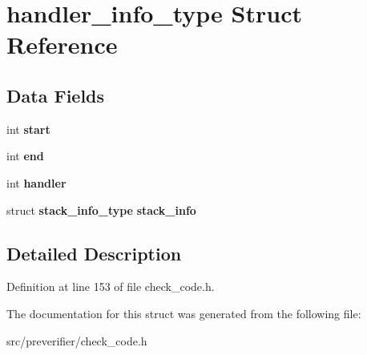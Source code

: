 \section{handler\_\-info\_\-type Struct Reference}
\label{structhandler__info__type}
\subsection*{Data Fields}
\begin{DoxyCompactItemize}
\item 
int {\bfseries start}\label{structhandler__info__type_a79ffb92f07062c2058a87ce0cb15ec42}

\item 
int {\bfseries end}\label{structhandler__info__type_aabad33be309cd4559102cd3df5931e39}

\item 
int {\bfseries handler}\label{structhandler__info__type_a7642d8eec414d6e15ab55367262d2345}

\item 
struct {\bf stack\_\-info\_\-type} {\bfseries stack\_\-info}\label{structhandler__info__type_a5229ad9923fa4659c892f2f2ece00dc4}

\end{DoxyCompactItemize}


\subsection{Detailed Description}


Definition at line 153 of file check\_\-code.h.



The documentation for this struct was generated from the following file:\begin{DoxyCompactItemize}
\item 
src/preverifier/check\_\-code.h\end{DoxyCompactItemize}

